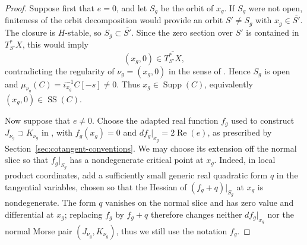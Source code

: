 \documentclass[10pt]{amsart}
\numberwithin{equation}{section}
\theoremstyle{plain}
\theoremstyle{definition}
\theoremstyle{remark}
\newcommand{\SSupp}{\operatorname{SS}}
\begin{document}
\begin{proof}
Suppose first that $e=0$, and let $S_g$ be the orbit of $x_g$. If
$S_g$ were not open, finiteness of the orbit decomposition would provide
an orbit $S'\neq S_g$ with $x_g\in\overline{S'}$. The closure is
$H$-stable, so $S_g\subset\overline{S'}$. Since the zero
section over $S'$ is contained in $T^*_{S'}X$, this would imply
\[
 (x_g,0)\in\overline{T^*_{S'}X},
\]
contradicting the regularity of $\nu_g=(x_g,0)$ in the sense of
\cite[(24.1)]{ABV92}. Hence $S_g$ is open and
$\mu_{\nu_g}(C)=i_{x_g}^{-1}C[-s]\neq0$. Thus
$x_g\in\operatorname{Supp}(C)$, equivalently
$(x_g,0)\in\SSupp(C)$.

Now suppose that $e\neq0$. Choose the adapted real function $f_g$ used
to construct $J_{\nu_g}\supset K_{\nu_g}$ in
\cite[(24.10)(a)]{ABV92}, with $f_g(x_g)=0$ and
$df_g|_{x_g}=2\operatorname{Re}(e)$, as prescribed by
Section~\ref{sec:cotangent-conventions}. We may choose its extension off
the normal slice so that $f_g|_{S_g}$ has a nondegenerate critical point
at $x_g$. Indeed, in local product coordinates, add a sufficiently small
generic real quadratic form $q$ in the tangential variables, chosen so
that the Hessian of $(f_g+q)|_{S_g}$ at $x_g$ is nondegenerate. The form
$q$ vanishes on the normal slice and has zero value and differential at
$x_g$; replacing $f_g$ by $f_g+q$ therefore changes neither
$df_g|_{x_g}$ nor the normal Morse pair $(J_{\nu_g},K_{\nu_g})$, thus we still
use the notation $f_g$.


\end{proof}
\end{document}
